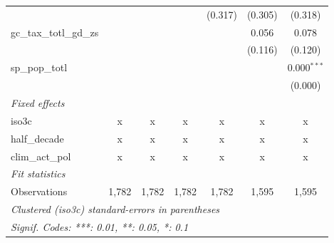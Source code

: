 \begin{tabular}{lcccccc}
                                               &                &                &                & (0.317)       & (0.305)        & (0.318)\\   
   gc\_tax\_totl\_gd\_zs                       &                &                &                &               & 0.056          & 0.078\\   
                                               &                &                &                &               & (0.116)        & (0.120)\\   
   sp\_pop\_totl                               &                &                &                &               &                & 0.000$^{***}$\\   
                                               &                &                &                &               &                & (0.000)\\   
   \emph{Fixed effects}\\
   iso3c                                       & x              & x              & x              & x             & x              & x\\  
   half\_decade                                & x              & x              & x              & x             & x              & x\\  
   clim\_act\_pol                              & x              & x              & x              & x             & x              & x\\  
   \midrule \emph{Fit statistics}\\
   Observations                                & 1,782          & 1,782          & 1,782          & 1,782         & 1,595          & 1,595\\  
   \midrule
   \multicolumn{7}{l}{\emph{Clustered (iso3c) standard-errors in parentheses}}\\
   \multicolumn{7}{l}{\emph{Signif. Codes: ***: 0.01, **: 0.05, *: 0.1}}\\
\end{tabular}
\par\endgroup


